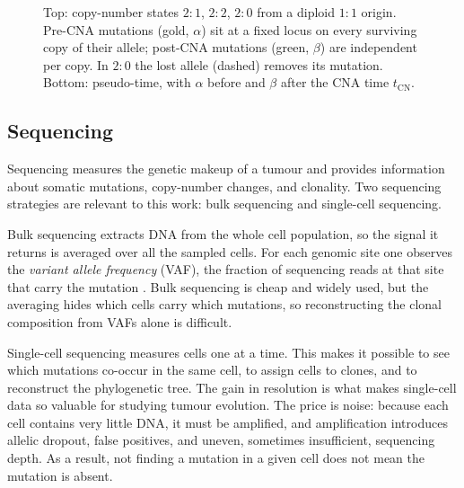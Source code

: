 \begin{figure}[H]
{%
}
\captionsetup{font=footnotesize}
\caption{Top: copy-number states $2{:}1$, $2{:}2$, $2{:}0$ from a diploid $1{:}1$ origin. Pre-CNA mutations (gold, $\alpha$) sit at a fixed locus on every surviving copy of their allele; post-CNA mutations (green, $\beta$) are independent per copy. In $2{:}0$ the lost allele (dashed) removes its mutation. Bottom: pseudo-time, with $\alpha$ before and $\beta$ after the CNA time $t_{\mathrm{CN}}$.}
\label{fig:cna-states}
\end{figure}
\subsection{Sequencing}

Sequencing measures the genetic makeup of a tumour and provides information about
somatic mutations, copy-number changes, and clonality. Two sequencing strategies are
relevant to this work: bulk sequencing and single-cell sequencing.

Bulk sequencing extracts DNA from the whole cell population, so the signal it returns
is averaged over all the sampled cells. For each genomic site one observes the
\emph{variant allele frequency} (VAF), the fraction of sequencing reads at that site
that carry the mutation \parencite{cocomello2025timing}. Bulk sequencing is cheap and
widely used, but the averaging hides which cells carry which mutations, so
reconstructing the clonal composition from VAFs alone is difficult.

Single-cell sequencing measures cells one at a time. This makes it possible to see
which mutations co-occur in the same cell, to assign cells to clones, and to
reconstruct the phylogenetic tree. The gain in resolution is what makes single-cell
data so valuable for studying tumour evolution. The price is noise: because each cell
contains very little DNA, it must be amplified, and amplification introduces allelic
dropout, false positives, and uneven, sometimes insufficient, sequencing depth. As a
result, not finding a mutation in a given cell does not mean the mutation is absent.

